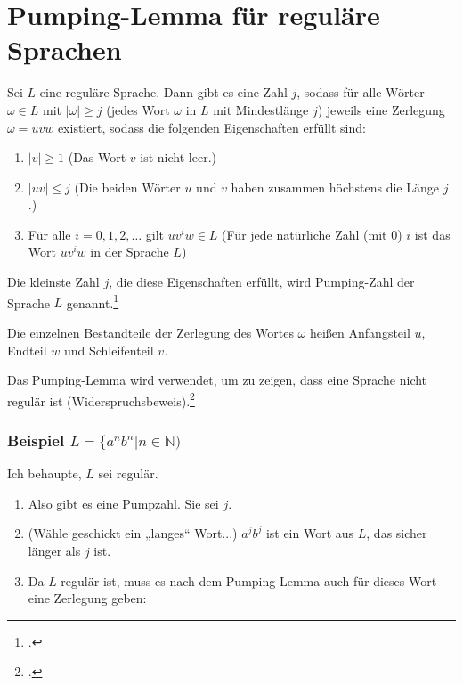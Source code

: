 \documentclass{lehramt-informatik-haupt}
\begin{document}
\chapter{Pumping-Lemma für reguläre Sprachen}

%
\noindent
Sei $L$ eine reguläre Sprache. Dann gibt es eine Zahl $j$, sodass für
alle Wörter $\omega \in L$  mit $|\omega| \geq j$ (jedes Wort $\omega$
in $L$ mit Mindestlänge $j$) jeweils eine Zerlegung $\omega = uvw$
existiert, sodass die folgenden Eigenschaften erfüllt sind:

\begin{enumerate}
\item $|v| \geq 1$
(Das Wort $v$ ist nicht leer.)

\item $|uv| \leq j$
(Die beiden Wörter $u$ und $v$ haben zusammen höchstens die Länge $j$.)

\item Für alle $i = 0, 1, 2, \dots$ gilt $uv^iw \in L$
(Für jede natürliche Zahl (mit 0) $i$ ist das Wort $uv^{i}w$ in der
Sprache $L$)
\end{enumerate}

Die kleinste Zahl $j$, die diese Eigenschaften erfüllt, wird
Pumping-Zahl der Sprache $L$ genannt.\footcite{wiki:pumping-lemma}

Die einzelnen Bestandteile der Zerlegung des Wortes $\omega$ heißen
Anfangsteil $u$, Endteil $w$ und Schleifenteil $v$.

\noindent
Das Pumping-Lemma wird verwendet, um zu zeigen, dass eine
Sprache nicht regulär ist (Widerspruchsbeweis).\footcite[Seite 63]{theo:fs:1}

%

\subsection{Beispiel $L = \{a^n b^n | n \in \mathbb{N})$}

Ich behaupte, $L$ sei regulär.

\begin{enumerate}
\item Also gibt es eine Pumpzahl. Sie sei $j$.

\item (Wähle geschickt ein „langes“ Wort...)
$a^j b^j$ ist ein Wort aus $L$, das sicher länger als $j$ ist.

\item Da $L$ regulär ist, muss es nach dem Pumping-Lemma auch für dieses
Wort eine Zerlegung geben:
\end{enumerate}
\end{document}
